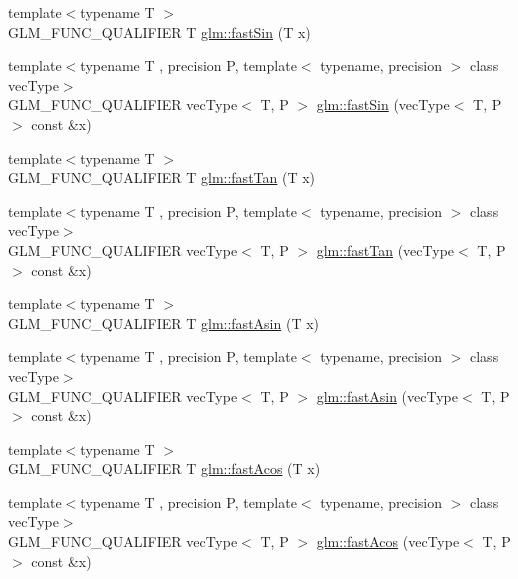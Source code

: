 \begin{DoxyCompactItemize}
\item 
{\footnotesize template$<$typename T $>$ }\\G\+L\+M\+\_\+\+F\+U\+N\+C\+\_\+\+Q\+U\+A\+L\+I\+F\+I\+E\+R T \hyperlink{group__gtx__fast__trigonometry_ga0aab3257bb3b628d10a1e0483e2c6915}{glm\+::fast\+Sin} (T x)
\item 
{\footnotesize template$<$typename T , precision P, template$<$ typename, precision $>$ class vec\+Type$>$ }\\G\+L\+M\+\_\+\+F\+U\+N\+C\+\_\+\+Q\+U\+A\+L\+I\+F\+I\+E\+R vec\+Type$<$ T, P $>$ \hyperlink{namespaceglm_a80a1ff93a0918b400dfb41a7f8842974}{glm\+::fast\+Sin} (vec\+Type$<$ T, P $>$ const \&x)
\item 
{\footnotesize template$<$typename T $>$ }\\G\+L\+M\+\_\+\+F\+U\+N\+C\+\_\+\+Q\+U\+A\+L\+I\+F\+I\+E\+R T \hyperlink{group__gtx__fast__trigonometry_gaf29b9c1101a10007b4f79ee89df27ba2}{glm\+::fast\+Tan} (T x)
\item 
{\footnotesize template$<$typename T , precision P, template$<$ typename, precision $>$ class vec\+Type$>$ }\\G\+L\+M\+\_\+\+F\+U\+N\+C\+\_\+\+Q\+U\+A\+L\+I\+F\+I\+E\+R vec\+Type$<$ T, P $>$ \hyperlink{namespaceglm_ab443760a1fea463f298e522fd11974dd}{glm\+::fast\+Tan} (vec\+Type$<$ T, P $>$ const \&x)
\item 
{\footnotesize template$<$typename T $>$ }\\G\+L\+M\+\_\+\+F\+U\+N\+C\+\_\+\+Q\+U\+A\+L\+I\+F\+I\+E\+R T \hyperlink{group__gtx__fast__trigonometry_ga562cb62c51fbfe7fac7db0bce706b81f}{glm\+::fast\+Asin} (T x)
\item 
{\footnotesize template$<$typename T , precision P, template$<$ typename, precision $>$ class vec\+Type$>$ }\\G\+L\+M\+\_\+\+F\+U\+N\+C\+\_\+\+Q\+U\+A\+L\+I\+F\+I\+E\+R vec\+Type$<$ T, P $>$ \hyperlink{namespaceglm_a5421346d5e7544a997ad0c9ec40456f7}{glm\+::fast\+Asin} (vec\+Type$<$ T, P $>$ const \&x)
\item 
{\footnotesize template$<$typename T $>$ }\\G\+L\+M\+\_\+\+F\+U\+N\+C\+\_\+\+Q\+U\+A\+L\+I\+F\+I\+E\+R T \hyperlink{group__gtx__fast__trigonometry_ga9721d63356e5d94fdc4b393a426ab26b}{glm\+::fast\+Acos} (T x)
\item 
{\footnotesize template$<$typename T , precision P, template$<$ typename, precision $>$ class vec\+Type$>$ }\\G\+L\+M\+\_\+\+F\+U\+N\+C\+\_\+\+Q\+U\+A\+L\+I\+F\+I\+E\+R vec\+Type$<$ T, P $>$ \hyperlink{namespaceglm_a297ec5f203c6fec20424ef3703771067}{glm\+::fast\+Acos} (vec\+Type$<$ T, P $>$ const \&x)

\end{DoxyCompactItemize}
